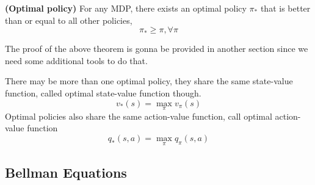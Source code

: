 \begin{theorem} {\rm\bf (Optimal policy)}
For any MDP, there exists an optimal policy $\pi_*$ that is better than or equal 
to all other policies, 
\begin{equation} 
\pi_*\geq\pi,\forall\pi 
\end{equation}
\end{theorem}

The proof of the above theorem is gonna be provided in another section since we 
need some additional tools to do that.

There may be more than one optimal policy, they share the same state-value function, 
called optimal state-value function though. 
\begin{equation} 
v_*(s)=\max_{\pi}v_\pi(s) 
\end{equation} 
Optimal policies also share the same action-value function, call optimal action-value 
function 
\begin{equation} 
q_*(s,a)=\max_{\pi}q_\pi(s,a) 
\end{equation}


\subsection{Bellman Equations}

